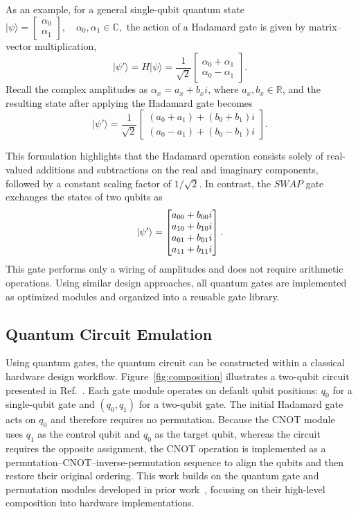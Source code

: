 \documentclass[conference]{IEEEtran}
\begin{document}
As an example, for a general single-qubit quantum state
$|\psi\rangle =
\begin{bmatrix}
\alpha_0 \\
\alpha_1
\end{bmatrix},
\quad
\alpha_0, \alpha_1 \in \mathbb{C},
$
the action of a Hadamard gate is given by matrix--vector multiplication,
\begin{equation}
|\psi'\rangle = H|\psi\rangle
=
\frac{1}{\sqrt{2}}
\begin{bmatrix}
\alpha_0 + \alpha_1 \\
\alpha_0 - \alpha_1
\end{bmatrix}.
\end{equation}
Recall the complex amplitudes as
$\alpha_x = a_x + b_x i$,
where $a_x,b_x\in \mathbb{R}$, and the resulting state after applying the Hadamard gate becomes
\begin{equation}
|\psi'\rangle =
\frac{1}{\sqrt{2}}
\begin{bmatrix}
(a_0 + a_1) + (b_0 + b_1)i \\
(a_0 - a_1) + (b_0 - b_1)i
\end{bmatrix}.
\end{equation}

This formulation highlights that the Hadamard operation consists solely of real-valued additions and subtractions on the real and imaginary components, followed by a constant scaling factor of $1/\sqrt{2}$. In contrast, the $SWAP$ gate exchanges the states of two qubits as
\begin{equation}
\ket{\psi'} =
\begin{bmatrix}
a_{00} + b_{00} i \\
a_{10} + b_{10} i \\
a_{01} + b_{01} i \\
a_{11} + b_{11} i
\end{bmatrix}.
\end{equation}
This gate performs only a wiring of amplitudes and does not require arithmetic operations. Using similar design approaches, all quantum gates are implemented as optimized modules and organized into a reusable gate library. 

\subsection{Quantum Circuit Emulation}
Using quantum gates, the quantum circuit can be constructed within a classical hardware design workflow. 
Figure~\ref{fig:composition} illustrates a two-qubit circuit presented in Ref.~\cite{hpdc26}. Each gate module operates on default qubit positions: $q_0$ for a single-qubit gate and $(q_0,q_1)$ for a two-qubit gate. The initial Hadamard gate acts on $q_0$ and therefore requires no permutation. Because the CNOT module uses $q_1$ as the control qubit and $q_0$ as the target qubit, whereas the circuit requires the opposite assignment, the CNOT operation is implemented as a permutation--CNOT--inverse-permutation sequence to align the qubits and then restore their original ordering. This work builds on the quantum gate and permutation modules developed in prior work~\cite{hpdc26,isqed2026}, focusing on their high-level composition into hardware implementations.
\end{document}
